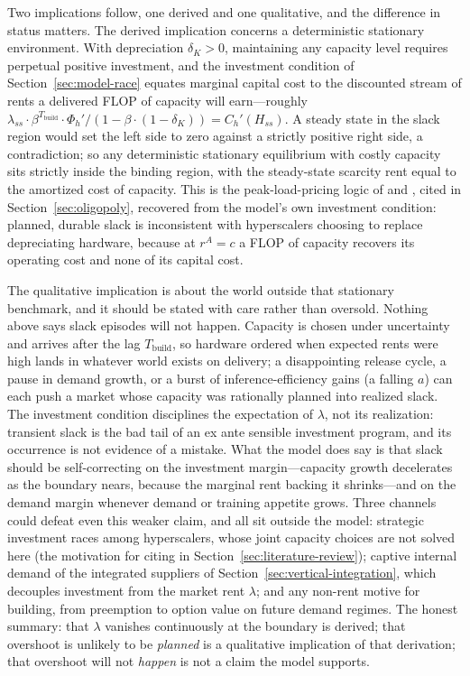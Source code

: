 \documentclass[11pt]{article}
\begin{document}
Two implications follow, one derived and one qualitative, and the difference in status matters. The derived implication concerns a deterministic stationary environment. With depreciation $\delta_K>0$, maintaining any capacity level requires perpetual positive investment, and the investment condition of Section~\ref{sec:model-race} equates marginal capital cost to the discounted stream of rents a delivered FLOP of capacity will earn---roughly $\lambda_{ss}\cdot\beta^{T_{\mathrm{build}}}\cdot\Phi_h'/\left(1-\beta\cdot(1-\delta_K)\right)=C_h'(H_{ss})$. A steady state in the slack region would set the left side to zero against a strictly positive right side, a contradiction; so any deterministic stationary equilibrium with costly capacity sits strictly inside the binding region, with the steady-state scarcity rent equal to the amortized cost of capacity. This is the peak-load-pricing logic of \citet{boiteux1960} and \citet{crewKleindorfer1976}, cited in Section~\ref{sec:oligopoly}, recovered from the model's own investment condition: planned, durable slack is inconsistent with hyperscalers choosing to replace depreciating hardware, because at $r^{A}=c$ a FLOP of capacity recovers its operating cost and none of its capital cost.

The qualitative implication is about the world outside that stationary benchmark, and it should be stated with care rather than oversold. Nothing above says slack episodes will not happen. Capacity is chosen under uncertainty and arrives after the lag $T_{\mathrm{build}}$, so hardware ordered when expected rents were high lands in whatever world exists on delivery; a disappointing release cycle, a pause in demand growth, or a burst of inference-efficiency gains (a falling $a$) can each push a market whose capacity was rationally planned into realized slack. The investment condition disciplines the expectation of $\lambda$, not its realization: transient slack is the bad tail of an ex ante sensible investment program, and its occurrence is not evidence of a mistake. What the model does say is that slack should be self-correcting on the investment margin---capacity growth decelerates as the boundary nears, because the marginal rent backing it shrinks---and on the demand margin whenever demand or training appetite grows. Three channels could defeat even this weaker claim, and all sit outside the model: strategic investment races among hyperscalers, whose joint capacity choices are not solved here (the motivation for citing \citet{besankoDoraszelski2004} in Section~\ref{sec:literature-review}); captive internal demand of the integrated suppliers of Section~\ref{sec:vertical-integration}, which decouples investment from the market rent $\lambda$; and any non-rent motive for building, from preemption to option value on future demand regimes. The honest summary: that $\lambda$ vanishes continuously at the boundary is derived; that overshoot is unlikely to be \emph{planned} is a qualitative implication of that derivation; that overshoot will not \emph{happen} is not a claim the model supports.
\end{document}
